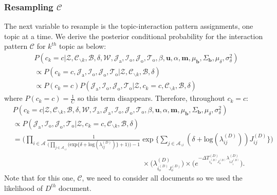 \documentclass[a4paper]{article}
\begin{document}
   \subsubsection{Resampling $\mathcal{C}$} \label{subsec: Resampling C}
   The next variable to resample is the topic-interaction pattern assignments, one topic at a time. We derive the posterior conditional probability for the interaction pattern $\mathcal{C}$ for $k^{th}$ topic as below:
   \begin{equation}
   \begin{aligned} & P(c_k=c|\mathcal{Z},   \mathcal{C}_{\backslash k},   \mathcal{B},\delta,\mathcal{W}, \mathcal{J}_{\mbox{a}}, \mathcal{I}_{\mbox{o}}, \mathcal{J}_{\mbox{o}}, \mathcal{T}_{\mbox{o}}, \beta, \boldsymbol{u}, \alpha, \boldsymbol{m},  \mu_{\boldsymbol{b}}, \Sigma_{\boldsymbol{b}}, \mu_\delta, \sigma^2_\delta)\\
   &\propto P(c_k=c, \mathcal{J}_{\mbox{a}}, \mathcal{I}_{\mbox{o}}, \mathcal{J}_{\mbox{o}}, \mathcal{T}_{\mbox{o}}|\mathcal{Z}, \mathcal{C}_{\backslash k},   \mathcal{B},\delta)\\
   & \propto P(c_k=c)P(\mathcal{J}_{\mbox{a}}, \mathcal{I}_{\mbox{o}}, \mathcal{J}_{\mbox{o}}, \mathcal{T}_{\mbox{o}}| \mathcal{Z}, c_k=c, \mathcal{C}_{\backslash k}, \mathcal{B}, \delta)
   \end{aligned}
   \end{equation}
   where $P(c_k=c) = \frac{1}{C}$ so this term disappears. Therefore, throughout $c_k=c$:
   \begin{equation}
   \begin{aligned}
   &P(c_k=c|\mathcal{Z},   \mathcal{C}_{\backslash k},   \mathcal{B}, \delta, \mathcal{W}, \mathcal{I}_{\mbox{a}}, \mathcal{J}_{\mbox{a}}, \mathcal{I}_{\mbox{o}}, \mathcal{J}_{\mbox{o}}, \mathcal{T}_{\mbox{o}}, \beta, \boldsymbol{u}, \alpha, \boldsymbol{m},  \mu_{\boldsymbol{b}}, \Sigma_{\boldsymbol{b}}, \mu_\delta, \sigma^2_\delta)\\&\propto P( \mathcal{J}_{\mbox{a}}, \mathcal{I}_{\mbox{o}}, \mathcal{J}_{\mbox{o}}, \mathcal{T}_{\mbox{o}}| \mathcal{Z}, c_k=c, \mathcal{C}_{\backslash k}, \mathcal{B}, \delta)\\&=\Big(\prod_{i\in \mathcal{A}} \frac{1}{\Big(\prod_{j \in \mathcal{A}_{\backslash i}} \Big(\mbox{exp}\{\delta+\mbox{log}(\lambda_{ij}^{(D)})\} + 1\Big)\Big)-1}\exp\Big\{\sum_{j \in \mathcal{A}_{\backslash i}} (\delta+\mbox{log}(\lambda_{ij}^{(D)}))J_{ij}^{(D)} \Big\}\Big)\\&\quad\quad\quad\quad\quad\quad\quad\quad\quad\quad\quad\quad\quad\quad\quad\quad\quad\quad\times \Big(\lambda^{(D)}_{i_o^{(D)}J_{o}^{(D)}}\Big)\times \Big(e^{-\Delta T^{(D)}_{i_o^{(D)}J_o^{(D)}}\lambda^{(D)}_{iJ^{(D)}_{i}}}\Big).
   \end{aligned}
   \end{equation} 
   Note that for this one, $\mathcal{C}$, we need to consider all documents so we used the likelihood of $D^{th}$ document.
\end{document}
